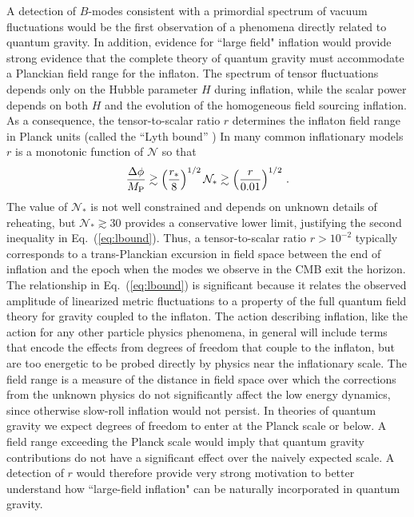 A detection of $B$-modes consistent with a primordial spectrum of vacuum fluctuations would be the first observation of a phenomena directly related to quantum gravity. In addition, evidence for ``large field" inflation would provide strong evidence that the complete theory of quantum gravity must accommodate a Planckian field range for the inflaton. The spectrum of tensor fluctuations depends only on the Hubble parameter $H$ during inflation, while the scalar power depends on both $H$ and the evolution of the homogeneous field sourcing inflation. As a consequence, the tensor-to-scalar ratio $r$ determines the inflaton field range in Planck units (called the ``Lyth bound'' \cite{Lyth:1996im})
In many common inflationary models $r$ is a monotonic function of $\mathcal{N}$ so that
\begin{equation}
\label{eq:lbound}
\frac{\Delta\phi}{M_{\rm P}}\gtrsim \left(\frac{r_\ast}{8}\right)^{1/2}\mathcal{N}_\ast\gtrsim \left(\frac{r}{0.01}\right)^{1/2}\,.
\end{equation}  
The value of $\mathcal{N}_\ast$ is not well constrained and depends on unknown details of reheating, but $\mathcal{N}_\ast\gtrsim 30$ provides a conservative lower limit, justifying the second inequality in Eq.~(\ref{eq:lbound}). Thus, a tensor-to-scalar ratio $r>10^{-2}$ typically corresponds to a trans-Planckian excursion in field space between the end of inflation and the epoch when the modes we observe in the CMB exit the horizon. The relationship in Eq.~(\ref{eq:lbound}) is significant because it relates the observed amplitude of linearized metric fluctuations to a property of the full quantum field theory for gravity coupled to the inflaton. The action describing inflation, like the action for any other particle physics phenomena, in general will include terms that encode the effects from degrees of freedom that couple to the inflaton, but are too energetic to be probed directly by physics near the inflationary scale. The field range is a measure of the distance in field space over which the corrections from the unknown physics do not significantly affect the low energy dynamics, since otherwise slow-roll inflation would not persist. In theories of quantum gravity we expect degrees of freedom to enter at the Planck scale or below. A field range exceeding the Planck scale would imply that quantum gravity contributions do not have a significant effect over the naively expected scale. A detection of $r$ would therefore provide very strong motivation to better understand how ``large-field inflation" can be naturally incorporated in quantum gravity.

